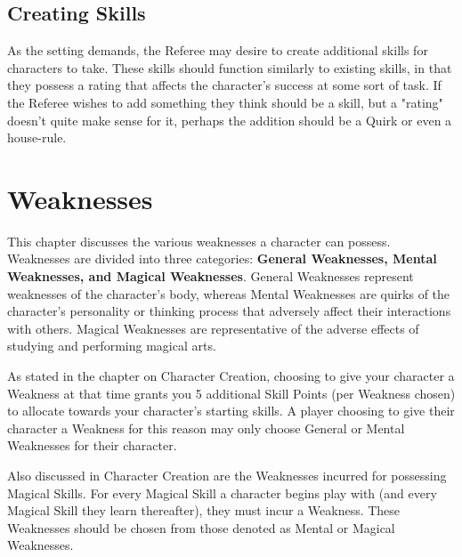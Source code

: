 \documentclass[oneside]{book}
\begin{document}
\begin{multicols}{2}
\section{Creating Skills}
As the setting demands, the Referee may desire to create additional skills for characters to take. 
These skills should function similarly to existing skills, in that they  possess a rating that affects the character's success
at some sort of task. If the Referee wishes to add something they think should be a skill, but a "rating" doesn't quite make sense for it,
perhaps the addition should be a Quirk or even a house-rule. 

\end{multicols}

\chapter{Weaknesses}

This chapter discusses the various weaknesses a character can possess. Weaknesses are divided into three categories: \textbf{General Weaknesses, Mental Weaknesses, and Magical Weaknesses}. General Weaknesses represent weaknesses of the character's body, whereas Mental Weaknesses are quirks of the character's personality or thinking process that adversely affect their interactions with others. Magical Weaknesses are representative of the adverse effects of studying and performing magical arts.

As stated in the chapter on Character Creation, choosing to give your character a Weakness at that time grants you 5 additional Skill Points (per Weakness chosen) to allocate towards your character's starting skills. A player choosing to give their character a Weakness for this reason may only choose General or Mental Weaknesses for their character. 

Also discussed in Character Creation are the Weaknesses incurred for possessing Magical Skills. For every Magical Skill a character begins play with (and every Magical Skill they learn thereafter), they must incur a Weakness. These Weaknesses should be chosen from those denoted as Mental or Magical Weaknesses.
\end{document}
